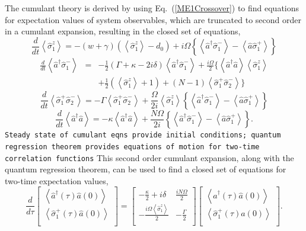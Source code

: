 \documentclass[aps,prl,twocolumn,
superscriptaddress,groupedaddress]{revtex4}
\newcommand{\dmcomment}[1]{{\tt #1}}
\begin{document}
The cumulant theory is derived by using Eq.~(\ref{ME1Crossover}) to find
equations for expectation values of system observables, which are
truncated to second order in a cumulant expansion, resulting in the
closed set of equations,
\begin{equation}
\frac{d}{dt} \left<\hat{\sigma}_{1}^{z}\right> =
-(w+\gamma)\left( \left<\hat{\sigma}_{1}^{z}\right> - d_0\right)
+i\Omega \left\{ \left<\hat{a}^{\dagger}\hat{\sigma}_{1}^{-}\right> -
\left<\hat{a}\hat{\sigma}_{1}^{+}\right> \right\}
\label{szCE1}
\end{equation}
\begin{eqnarray}
\frac{d}{dt} \left<\hat{a}^{\dagger}\hat{\sigma}_{1}^{-}\right>
&=& -\frac{1}{2}(\Gamma+\kappa-2 i \delta)
\left<\hat{a}^{\dagger}\hat{\sigma}_{1}^{-}\right>
+\frac{i \Omega}{2} \bigg\{
\left<\hat{a}^{\dagger}\hat{a}\right> \left<\hat{\sigma}_{1}^{z}\right>
\nonumber
\\
&&
+ \frac{1}{2} \left(  \left<\hat{\sigma}_{1}^{z}\right> + 1 \right)
+ (N-1) \left<\hat{\sigma}_{1}^{+}\hat{\sigma}_{2}^{-}\right>
\bigg\}
\end{eqnarray}
\begin{equation}
\frac{d}{dt} \left<\hat{\sigma}_{1}^{+}\hat{\sigma}_{2}^{-}\right> =
-\Gamma \left<\hat{\sigma}_{1}^{+}\hat{\sigma}_{2}^{-}\right> +
\frac{\Omega}{2i} \left< \hat{\sigma}_{1}^{z} \right>
\left\{ \left<\hat{a}^{\dagger}\hat{\sigma}_{1}^{-}\right> -
\left<\hat{a}\hat{\sigma}_{1}^{+}\right> \right\}
\end{equation}
\begin{equation}
\frac{d}{dt} \left<\hat{a}^{\dagger}\hat{a}\right> =
-\kappa \left<\hat{a}^{\dagger}\hat{a}\right>
+\frac{N \Omega}{2i}
\left\{ \left<\hat{a}^{\dagger}\hat{\sigma}_{1}^{-}\right> -
\left<\hat{a}\hat{\sigma}_{1}^{+}\right> \right\}.
\label{adaCE1}
\end{equation}
\dmcomment{Steady state of cumulant eqns provide initial conditions;
quantum regression theorem provides equations of motion for two-time
correlation functions}  This second order cumulant expansion, along with
the quantum regression theorem, can be used to find a closed set of
equations for two-time expectation values,
\begin{equation}
\frac{d}{d\tau}
\left[ \begin{array}{c}
\left<\hat{a}^{\dagger}(\tau)\hat{a}(0)\right> \\
\left<\hat{\sigma}_{1}^{+}(\tau)\hat{a}(0)\right>  \\
\end{array} \right]
=
\left[ \begin{array}{cc}
-\frac{\kappa}{2} +i \delta & \frac{iN\Omega}{2}  \\
-\frac{i\Omega\left<\hat{\sigma}_{1}^{z}\right>}{2}& -\frac{\Gamma}{2}  \\
\end{array} \right]
\left[ \begin{array}{c}
\left<\hat{a}^{\dagger}(\tau)\hat{a}(0)\right> \\
\left<\hat{\sigma}_{1}^{+}(\tau)\hat{a}(0)\right>  \\
\end{array} \right].
\label{TwoTimeCE1}
\end{equation}
\end{document}
